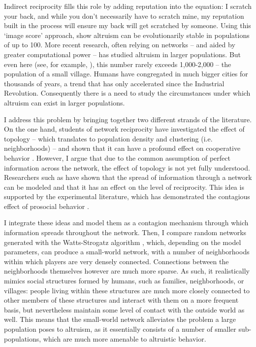 \documentclass{JASSS}
\begin{document}
Indirect reciprocity fills this role by adding reputation into the equation: I scratch your back, and while you don't necessarily have to scratch mine, my reputation built in the process will ensure my back will get scratched by someone. Using this `image score' approach, \cite{Nowak1998} show altruism can be evolutionarily stable in populations of up to 100. More recent research, often relying on networks -- and aided by greater computational power -- has studied altruism in larger populations. But even here (see, for example, \cite{Peleteiro2014}), this number rarely exceeds 1,000-2,000 -- the population of a small village. Humans have congregated in much bigger cities for thousands of years, a trend that has only accelerated since the Industrial Revolution. Consequently there is a need to study the circumstances under which altruism can exist in larger populations.

I address this problem by bringing together two different strands of the literature. On the one hand, students of network reciprocity have investigated the effect of topology -- which translates to population density and clustering (i.e. neighborhoods) -- and shown that it can have a profound effect on cooperative behavior \citep{Santos2008}. However, I argue that due to the common assumption of perfect information across the network, the effect of topology is not yet fully understood. Researchers such as \cite{Mohtashemi2003} have shown that the spread of information through a network can be modeled and that it has an effect on the level of reciprocity. This idea is supported by the experimental literature, which has demonstrated the contagious effect of prosocial behavior \citep{Tsvetkova2014, Kang2015, Ito2016}.

I integrate these ideas and model them as a contagion mechanism through which information spreads throughout the network. Then, I compare random networks generated with the  Watts-Strogatz algorithm \citep{Watts1998}, which, depending on the model parameters, can produce a small-world network, with a number of neighborhoods within which players are very densely connected. Connections between the neighborhoods themselves however are much more sparse. As such, it realistically mimics social structures formed by humans, such as families, neighborhoods, or villages: people living within these structures are much more closely connected to other members of these structures and interact with them on a more frequent basis, but nevertheless maintain some level of contact with the outside world as well. This means that the small-world network alleviates the problem a large population poses to altruism, as it essentially consists of a number of smaller sub-populations, which are much more amenable to altruistic behavior.
\end{document}
